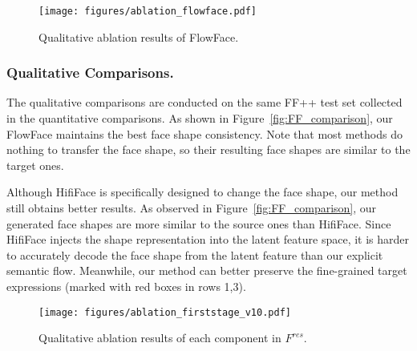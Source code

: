 \begin{figure}[t]
\centering
\texttt{[image: figures/ablation\_flowface.pdf]}
\caption{
Qualitative ablation results of FlowFace.
}
\label{fig:face_swapping_result}
\end{figure}

\subsubsection{Qualitative Comparisons.} The qualitative comparisons are conducted on the same FF++ test set collected in the quantitative comparisons. As shown in Figure~\ref{fig:FF_comparison}, our FlowFace maintains the best face shape consistency. Note that most methods do nothing to transfer the face shape, so their resulting face shapes are similar to the target ones.

Although HifiFace is specifically designed to change the face shape, our method still obtains better results. As observed in Figure~\ref{fig:FF_comparison}, our generated face shapes are more similar to the source ones than HifiFace. Since HifiFace injects the shape representation into the latent feature space, it is harder to accurately decode the face shape from the latent feature than our explicit semantic flow.
Meanwhile, our method can better preserve the fine-grained target expressions (marked with red boxes in rows 1,3). 

\begin{table}[t]

\caption{Subjective comparisons with SimSwap and HifiFace on FF++.}
\centering
\label{tab:subjective_comparison}
\end{table}

\begin{figure*}[t]
\centering
\texttt{[image: figures/ablation\_firststage\_v10.pdf]}  
\caption{Qualitative ablation results of each component in $F^{res}$.}
\label{fig:ablation_first}
\end{figure*}

